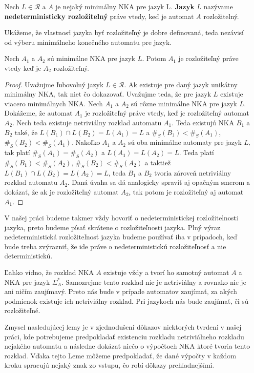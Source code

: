 \begin{definition}
\label{def:nedeterministic_decomposability_of_language}
Nech $ L \in \mathscr{R} $ a $ A $ je nejaký minimálny NKA pre jazyk L. \textbf{Jazyk} $ L $ nazývame \textbf{nedeterministicky rozložitelný} práve vtedy, keď je automat $ A $ rozložitelný.
\end{definition}

Ukážeme, že vlastnosť jazyka byť rozložiteľný je dobre definovaná, teda nezávisí od výberu minimálneho konečného automatu pre jazyk.

\begin{proposition}
Nech $ A_1 $ a $ A_2 $ sú minimálne NKA pre jazyk $ L $. Potom $ A_1 $ je rozložiteľný práve vtedy keď je $ A_2 $ rozložiteľný.
\end{proposition}

\begin{proof}
Uvažujme ľubovolný jazyk $ L \in \mathscr{R} $. Ak existuje pre daný jazyk unikátny minimálny NKA, tak niet čo dokazovať. Uvažujme teda, že pre jazyk $ L $ existuje viacero minimálnych NKA. Nech $ A_1 $ a $ A_2 $ sú rôzne minimálne NKA pre jazyk $ L $. Dokážeme, že automat $ A_1 $ je rozložiteľný práve vtedy, keď je rozložiteľný automat $ A_2 $. Nech teda existuje netriviálny rozklad automatu $ A_1 $. Teda existujú NKA $ B_1 $ a $ B_2 $ také, že $ L(B_1) \cap L(B_2) = L(A_1) = L $ a $ \#_S(B_1) < \#_S(A_1) $, $ \#_S(B_2) < \#_S(A_1) $. Nakoľko $ A_1 $ a $ A_2 $ sú oba minimálne automaty pre jazyk $ L $, tak platí $ \#_S(A_1) = \#_S(A_2) $ a $ L(A_1) = L(A_2) = L $. Teda platí $ \#_S(B_1) < \#_S(A_2) $, $ \#_S(B_2) < \#_S(A_2) $ a taktiež $ L(B_1) \cap L(B_2) = L(A_2) = L $, teda $ B_1 $ a $ B_2 $ tvoria zároveň netriviálny rozklad automatu $ A_2 $. Daná úvaha sa dá analogicky spraviť aj opačným smerom a dokázať, že ak je rozložiteľný automat $ A_2 $, tak potom je rozložiteľný aj automat $ A_1 $.
\end{proof}

\begin{note}
V našej práci budeme takmer vždy hovoriť o nedeterministickej rozložitelnosti jazyka, preto budeme písať skrátene o rozložiteľnosti jazyka. Plný výraz nedeterministická rozložiteľnosť jazyka budeme používať iba v prípadoch, keď bude treba zvýrazniť, že ide práve o nedeterministickú rozložiteľnosť a nie deterministickú.
\end{note}

Ľahko vidno, že rozklad NKA $ A $ existuje vždy a tvorí ho samotný automat $ A $ a NKA pre jazyk $ \Sigma_A^{*} $. Samozrejme tento rozklad nie je netriviálny a rovnako nie je ani ničím zaujímavý. Preto nás bude v prípade automatov zaujímať, za akých podmienok existuje ich netriviálny rozklad. Pri jazykoch nás bude zaujímať, či sú rozložiteľné.
\par
Zmysel nasledujúcej lemy je v zjednodušení dôkazov niektorých tvrdení v našej práci, kde potrebujeme predpokladať existenciu rozkladu netriviálneho rozkladu nejakého automatu a následne dokázať niečo o výpočtoch NKA ktoré tvoria tento rozklad. Vďaka tejto Leme môžeme predpokladať, že dané výpočty v každom kroku spracujú nejaký znak zo vstupu, čo robí dôkazy prehľadnejšími.

